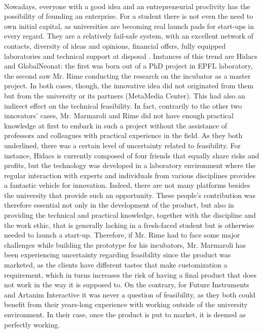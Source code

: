 \documentclass[twoside]{report}
\begin{document}
\paragraph{}
Nowadays, everyone with a good idea and an entrepreneurial proclivity has the possibility of founding an enterprise. For a student there is not even the need to own initial capital, as universities are becoming real launch pads for start-ups in every regard. They are a relatively fail-safe system, with an excellent network of contacts, diversity of ideas and opinions, financial offers, fully equipped laboratories and technical support at disposal \cite{stagars_university_2015}. Instances of this trend are Hidacs and GlobalNeonat: the first was born out of a PhD project in EPFL laboratory, the second saw Mr. Rime conducting the research on the incubator as a master project. In both cases, though, the innovative idea did not originated from them but from the university or its partners (MetaMedia Center). This had also an indirect effect on the technical feasibility. In fact, contrarily to the other two innovators’ cases, Mr. Marmaroli and Rime did not have enough practical knowledge at first to embark in such a project without the assistance of professors and colleagues with practical experience in the field. As they both underlined, there was a certain level of uncertainty related to feasibility. For instance, Hidacs is currently composed of four friends that equally share risks and profits, but the technology was developed in a laboratory environment where the regular interaction with experts and individuals from various disciplines provides a fantastic vehicle for innovation. Indeed, there are not many platforms besides the university that provide such an opportunity. These people’s contribution was therefore essential not only in the development of the product, but also in providing the technical and practical knowledge, together with the discipline and the work ethic, that is generally lacking in a fresh-faced student but is otherwise needed to launch a start-up. Therefore, if Mr. Rime had to face some major challenges while building the prototype for his incubators, Mr. Marmaroli has been experiencing uncertainty regarding feasibility since the product was marketed, as the clients have different tastes that make customization a requirement, which in turns increases the risk of having a final product that does not work in the way it is supposed to. On the contrary, for Future Instruments and Artanim Interactive it was never a question of feasibility, as they both could benefit from their years-long experience with working outside of the university environment. In their case, once the product is put to market, it is deemed as perfectly working.
\end{document}
